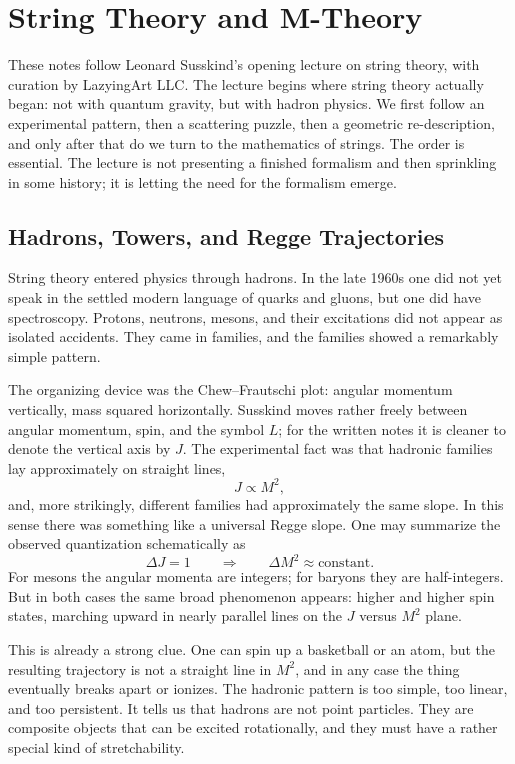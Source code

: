 \chapter{String Theory and M-Theory}

These notes follow Leonard Susskind's opening lecture on string theory, with curation by LazyingArt LLC. The lecture begins where string theory actually began: not with quantum gravity, but with hadron physics. We first follow an experimental pattern, then a scattering puzzle, then a geometric re-description, and only after that do we turn to the mathematics of strings. The order is essential. The lecture is not presenting a finished formalism and then sprinkling in some history; it is letting the need for the formalism emerge.

\section{Hadrons, Towers, and Regge Trajectories}

String theory entered physics through hadrons. In the late 1960s one did not yet speak in the settled modern language of quarks and gluons, but one did have spectroscopy. Protons, neutrons, mesons, and their excitations did not appear as isolated accidents. They came in families, and the families showed a remarkably simple pattern.

The organizing device was the Chew--Frautschi plot: angular momentum vertically, mass squared horizontally. Susskind moves rather freely between angular momentum, spin, and the symbol \(L\); for the written notes it is cleaner to denote the vertical axis by \(J\). The experimental fact was that hadronic families lay approximately on straight lines,
\begin{equation}
J \propto M^2,
\end{equation}
and, more strikingly, different families had approximately the same slope. In this sense there was something like a universal Regge slope. One may summarize the observed quantization schematically as
\begin{equation}
\Delta J = 1
\qquad \Longrightarrow \qquad
\Delta M^2 \approx \text{constant}.
\end{equation}
For mesons the angular momenta are integers; for baryons they are half-integers. But in both cases the same broad phenomenon appears: higher and higher spin states, marching upward in nearly parallel lines on the \(J\) versus \(M^2\) plane.

This is already a strong clue. One can spin up a basketball or an atom, but the resulting trajectory is not a straight line in \(M^2\), and in any case the thing eventually breaks apart or ionizes. The hadronic pattern is too simple, too linear, and too persistent. It tells us that hadrons are not point particles. They are composite objects that can be excited rotationally, and they must have a rather special kind of stretchability.

